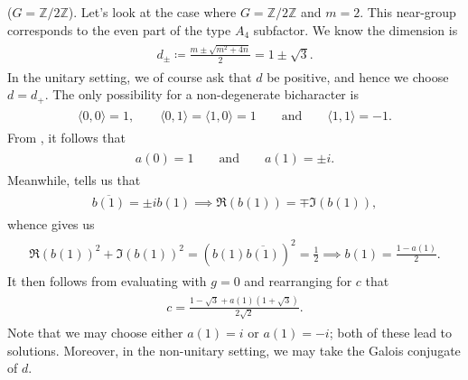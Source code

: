 \noindent\begin{example}\textup{($G = \mathbb{Z}/2\mathbb{Z}$).} Let's look at the case where $G = \mathbb{Z}/2\mathbb{Z}$ and $m = 2$. This near-group corresponds to the even part of the type $A_4$ subfactor. We know the dimension is
\begin{align*}
\begin{split}
d_\pm \coloneqq \frac{m \pm \sqrt{m^2 + 4n}}{2} = 1 \pm \sqrt{3}.
\end{split}
\end{align*}
\noindent In the unitary setting, we of course ask that $d$ be positive, and hence we choose $d = d_+$. The only possibility for a non-degenerate bicharacter is
\begin{align*}
\begin{split}
\langle 0, 0\rangle = 1,\qquad\langle 0, 1\rangle = \langle 1, 0\rangle = 1\qquad\text{and}\qquad\langle 1, 1\rangle = -1.
\end{split}
\end{align*}
\noindent From \cite[Equation (7.8)]{Izu17}, it follows that
\begin{align*}
\begin{split}
a(0) = 1\qquad\text{and}\qquad a(1) = \pm i.
\end{split}
\end{align*}
\noindent Meanwhile, \cite[Equation (9.4)]{Izu17} tells us that
\begin{align*}
\begin{split}
\overline{b(1)} = \pm i b(1) \implies \mathfrak{R}(b(1)) = \mp \mathfrak{I}(b(1)),
\end{split}
\end{align*}
\noindent whence \cite[Equation (9.3)]{Izu17} gives us
\begin{align*}
\begin{split}
\mathfrak{R}(b(1))^2 + \mathfrak{I}(b(1))^2 = (b(1)\overline{b(1)})^2 = \frac{1}{2} \implies b(1) = \frac{1 - a(1)}{2}.
\end{split}
\end{align*}
\noindent It then follows from evaluating \cite[Equation (9.1)]{Izu17} with $g = 0$ and rearranging for $c$ that
\begin{align*}
\begin{split}
c = \frac{1 - \sqrt{3} + a(1)(1 + \sqrt{3})}{2\sqrt{2}}.
\end{split}
\end{align*}
\noindent Note that we may choose either $a(1) = i$ or $a(1) = -i$; both of these lead to solutions. Moreover, in the non-unitary setting, we may take the Galois conjugate of $d$.
\end{example}
\newpage

